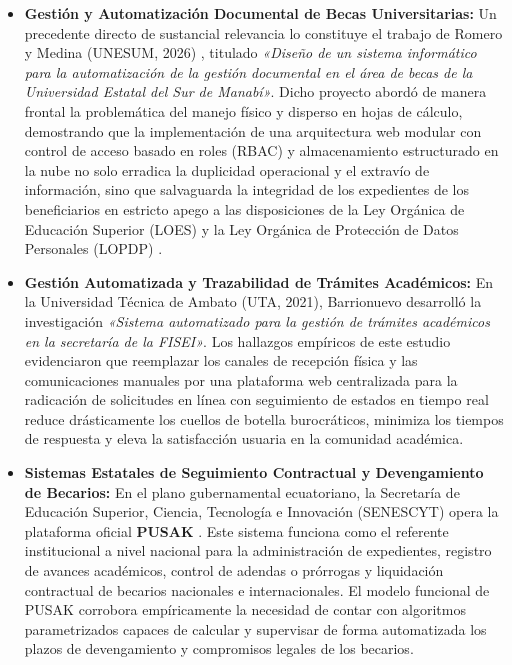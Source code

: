 \begin{itemize}[leftmargin=*]
    \item \textbf{Gestión y Automatización Documental de Becas Universitarias:} Un precedente directo de sustancial relevancia lo constituye el trabajo de Romero y Medina (UNESUM, 2026) \cite{romero_unesum_becas}, titulado \textit{«Diseño de un sistema informático para la automatización de la gestión documental en el área de becas de la Universidad Estatal del Sur de Manabí»}. Dicho proyecto abordó de manera frontal la problemática del manejo físico y disperso en hojas de cálculo, demostrando que la implementación de una arquitectura web modular con control de acceso basado en roles (RBAC) y almacenamiento estructurado en la nube no solo erradica la duplicidad operacional y el extravío de información, sino que salvaguarda la integridad de los expedientes de los beneficiarios en estricto apego a las disposiciones de la Ley Orgánica de Educación Superior (LOES) \cite{loes} y la Ley Orgánica de Protección de Datos Personales (LOPDP) \cite{lopdp_ecuador}.
    
    \item \textbf{Gestión Automatizada y Trazabilidad de Trámites Académicos:} En la Universidad Técnica de Ambato (UTA, 2021), Barrionuevo \cite{barrionuevo_uta_tramites} desarrolló la investigación \textit{«Sistema automatizado para la gestión de trámites académicos en la secretaría de la FISEI»}. Los hallazgos empíricos de este estudio evidenciaron que reemplazar los canales de recepción física y las comunicaciones manuales por una plataforma web centralizada para la radicación de solicitudes en línea con seguimiento de estados en tiempo real reduce drásticamente los cuellos de botella burocráticos, minimiza los tiempos de respuesta y eleva la satisfacción usuaria en la comunidad académica.
    
    \item \textbf{Sistemas Estatales de Seguimiento Contractual y Devengamiento de Becarios:} En el plano gubernamental ecuatoriano, la Secretaría de Educación Superior, Ciencia, Tecnología e Innovación (SENESCYT) opera la plataforma oficial \textbf{PUSAK} \cite{senescyt_pusak}. Este sistema funciona como el referente institucional a nivel nacional para la administración de expedientes, registro de avances académicos, control de adendas o prórrogas y liquidación contractual de becarios nacionales e internacionales. El modelo funcional de PUSAK corrobora empíricamente la necesidad de contar con algoritmos parametrizados capaces de calcular y supervisar de forma automatizada los plazos de devengamiento y compromisos legales de los becarios.
    

\end{itemize}
